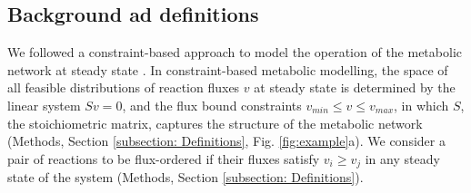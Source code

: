 \documentclass[12pt]{article}
\begin{document}
\subsection{Background ad definitions}
We followed a constraint-based approach to model the operation of the metabolic network at steady state \cite{Orth2010}. In constraint-based metabolic modelling, the space of all feasible distributions of reaction fluxes $v$ at steady state is determined by the linear system $Sv = 0$, and the flux bound constraints $v_{min} \leq v \leq v_{max}$, in which $S$, the stoichiometric matrix, captures the structure of the metabolic network (Methods, Section \ref{subsection: Definitions}, Fig. \ref{fig:example}a). We consider a pair of reactions to be flux-ordered if their fluxes satisfy $v_i \geq v_j$ in any steady state of the system (Methods, Section \ref{subsection: Definitions}).
\end{document}
